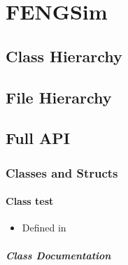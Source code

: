 \documentclass[letterpaper,10pt,english]{sphinxmanual}
\begin{document}
\chapter{FENGSim}
\label{\detokenize{api/library_root:fengsim}}\label{\detokenize{api/library_root::doc}}

\section{Class Hierarchy}
\label{\detokenize{api/library_root:class-hierarchy}}



\section{File Hierarchy}
\label{\detokenize{api/library_root:file-hierarchy}}



\section{Full API}
\label{\detokenize{api/library_root:full-api}}

\subsection{Classes and Structs}
\label{\detokenize{api/library_root:classes-and-structs}}
\sphinxstepscope


\subsubsection{Class test}
\label{\detokenize{api/classtest:class-test}}\label{\detokenize{api/classtest:exhale-class-classtest}}\label{\detokenize{api/classtest::doc}}\begin{itemize}
\item {} 
\sphinxAtStartPar
Defined in 

\end{itemize}


\paragraph{Class Documentation}
\label{\detokenize{api/classtest:class-documentation}}
\end{document}
